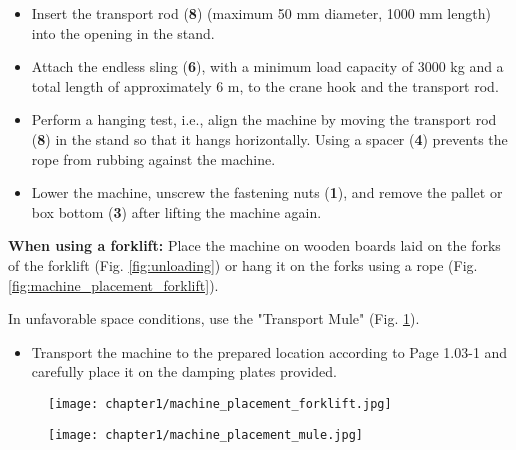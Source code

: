 
\begin{itemize}
    \item Insert the transport rod (\textbf{8}) (maximum 50 mm diameter, 1000 mm length) into the opening in the stand.
    \item Attach the endless sling (\textbf{6}), with a minimum load capacity of 3000 kg and a total length of approximately 6 m, to the crane hook and the transport rod.
\end{itemize}


\newpage

\begin{itemize}
    \item Perform a hanging test, i.e., align the machine by moving the transport rod (\textbf{8}) in the stand so that it hangs horizontally. Using a spacer (\textbf{4}) prevents the rope from rubbing against the machine.
    
    \item Lower the machine, unscrew the fastening nuts (\textbf{1}), and remove the pallet or box bottom (\textbf{3}) after lifting the machine again.
\end{itemize}

\textbf{When using a forklift:} Place the machine on wooden boards laid on the forks of the forklift (Fig. \ref{fig:unloading}) or hang it on the forks using a rope (Fig. \ref{fig:machine_placement_forklift}).
    
In unfavorable space conditions, use the "Transport Mule" (Fig. \ref{fig:machine_placement_mule}).

\begin{itemize}
    \item Transport the machine to the prepared location according to Page 1.03-1 and carefully place it on the damping plates provided.
\end{itemize}

\begin{figure}[h]
\centering
\begin{minipage}[t]{0.45\textwidth}
    \centering
    \texttt{[image: chapter1/machine\_placement\_forklift.jpg]} %
    \caption{}
    \label{fig:machine_placement_forklift}
\end{minipage}
\hfill
\begin{minipage}[t]{0.45\textwidth}
    \centering
    \texttt{[image: chapter1/machine\_placement\_mule.jpg]} %
    \caption{}
    \label{fig:machine_placement_mule}
\end{minipage}
\end{figure}

